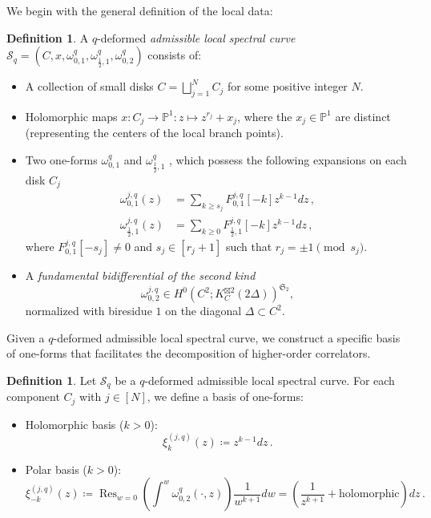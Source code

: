 \documentclass[reqno,11pt]{amsart}
\theoremstyle{plain}
\theoremstyle{definition}
\newtheorem{definition}[theorem]{Definition}
\theoremstyle{remark}
\numberwithin{equation}{section}
\newcommand{\mb}[1]{\mathbb{#1}}
\newcommand{\mf}[1]{\mathfrak{#1}}
\newcommand{\mc}[1]{\mathcal{#1}}
\newcommand{\1}{\mathds{1}}
\renewcommand{\P}{\mb{P}}
\newcommand{\2}{\frac{1}{2}}
\DeclareMathOperator*{\Res}{Res}
\begin{document}
{				We begin with the general definition of the local data:
				\begin{definition}\label{d:sc}
					A $q$-deformed \emph{admissible local spectral curve} $ \mc{S}_q = ( C, x, \omega^{q}_{0,1}, \omega^{q}_{\frac{1}{2},1}, \omega^{q}_{0,2})
					$ consists of:
					\begin{itemize}
						\item[(i)] A
						collection of small disks $ C = \bigsqcup_{j=1}^N C_j $ for some positive integer $N$.
						\item[(ii)] Holomorphic maps $ x \colon C_j \to \P^1 \colon z \mapsto z^{r_j} + x_j$, where the $ x_j \in \P^1$ are distinct (representing the centers of the local branch points).
						\item[(iii)] Two one-forms $\omega^{q}_{0,1}$ and $ \omega^{q}_{\frac{1}{2},1} $ , which possess the following expansions on each disk $C_j$
						\begin{align}
							\omega^{j,q}_{0,1} (z) 
							&= 
							\sum_{k \geq s_j} F^{j,q}_{0,1}[-k] z^{k-1} dz \,,
							\\
							\omega^{j,q}_{\frac{1}{2},1} (z) 
							&= 
							\sum_{k \geq 0} F^{j,q}_{\frac{1}{2},1}[-k] z^{k-1} dz \,,
						\end{align}
						where $ F^{j,q}_{0,1} [-s_j] \neq 0$ and $s_j \in [r_j+1] $ such that $ r_j = \pm 1 \pmod{s_j}$.
						\item[(iv)] A \emph{fundamental bidifferential of the second kind}
						\begin{equation}
							\omega^{j,q}_{0,2} \in H^0 ( C^2 ; K_C^{\boxtimes 2}(2 \Delta))^{\mf{S}_2},
						\end{equation}
						normalized with biresidue $ 1$ on the diagonal $\Delta \subset C^2 $.
					\end{itemize}
				\end{definition}
				Given a $q$-deformed admissible local spectral curve, we construct a specific basis of one-forms that facilitates the decomposition of higher-order correlators.
				\begin{definition}\label{d:xibasis}Let $\mathcal{S}_q$ be a $q$-deformed admissible local spectral curve. For each component $C_j$ with $j \in [N]$, we define a basis of one-forms:
					\begin{itemize}
						\item[(a)] Holomorphic basis ($k>0$):
						\begin{equation}
							\xi^{(j,q)}_{k} (z) \coloneqq z^{k-1} dz \,.
						\end{equation}
						\item[(b)] Polar basis ($k>0$):
						\begin{equation}
							\xi^{(j,q)}_{-k} (z) \coloneqq \Res_{w = 0} \left( \int^{w} \omega^{q}_{0,2}( \mathord{\cdot}, z) \right) \frac{1}{w^{k+1}} d w = \left( \frac{1}{z^{k+1}} + \text{holomorphic} \right) dz \,.
						\end{equation}
					\end{itemize}
				\end{definition}
				
}
\end{document}
